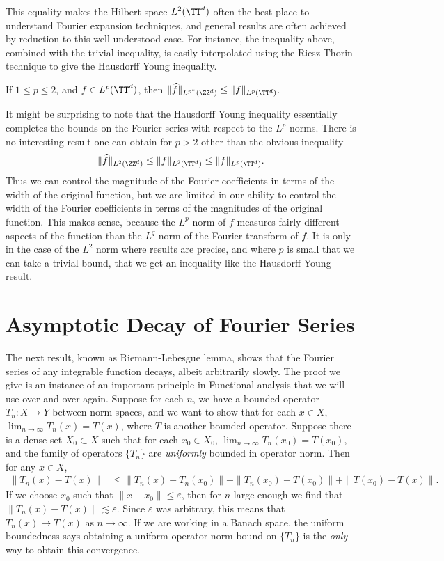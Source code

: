 This equality makes the Hilbert space $L^2(\TT^d)$ often the best place to understand Fourier expansion techniques, and general results are often achieved by reduction to this well understood case. For instance, the inequality above, combined with the trivial inequality, is easily interpolated using the Riesz-Thorin technique to give the Hausdorff Young inequality.

\begin{theorem}
    If $1 \leq p \leq 2$, and $f \in L^p(\TT^d)$, then $\| \widehat{f} \|_{L^{p^*}(\ZZ^d)} \leq \| f \|_{L^p(\TT^d)}$.
\end{theorem}

It might be surprising to note that the Hausdorff Young inequality essentially completes the bounds on the Fourier series with respect to the $L^p$ norms. There is no interesting result one can obtain for $p > 2$ other than the obvious inequality
%
\[ \| \widehat{f} \|_{L^2(\ZZ^d)} \leq \| f \|_{L^2(\TT^d)} \leq \| f \|_{L^p(\TT^d)}. \]
%
Thus we can control the magnitude of the Fourier coefficients in terms of the width of the original function, but we are limited in our ability to control the width of the Fourier coefficients in terms of the magnitudes of the original function. This makes sense, because the $L^p$ norm of $f$ measures fairly different aspects of the function than the $L^q$ norm of the Fourier transform of $f$. It is only in the case of the $L^2$ norm where results are precise, and where $p$ is small that we can take a trivial bound, that we get an inequality like the Hausdorff Young result.

\section{Asymptotic Decay of Fourier Series}

The next result, known as Riemann-Lebesgue lemma, shows that the Fourier series of any integrable function decays, albeit arbitrarily slowly. The proof we give is an instance of an important principle in Functional analysis that we will use over and over again. Suppose for each $n$, we have a bounded operator $T_n: X \to Y$ between norm spaces, and we want to show that for each $x \in X$, $\lim_{n \to \infty} T_n(x) = T(x)$, where $T$ is another bounded operator. Suppose there is a dense set $X_0 \subset X$ such that for each $x_0 \in X_0$, $\lim_{n \to \infty} T_n(x_0) = T(x_0)$, and the family of operators $\{ T_n \}$ are {\it uniformly} bounded in operator norm. Then for any $x \in X$,
%
\begin{align*}
    \| T_n(x) - T(x) \| &\leq \| T_n(x) - T_n(x_0) \| + \| T_n(x_0) - T(x_0) \| + \| T(x_0) - T(x) \|.
\end{align*}
%
If we choose $x_0$ such that $\| x - x_0 \| \leq \varepsilon$, then for $n$ large enough we find that $\| T_n(x) - T(x) \| \lesssim \varepsilon$. Since $\varepsilon$ was arbitrary, this means that $T_n(x) \to T(x)$ as $n \to \infty$. If we are working in a Banach space, the uniform boundedness says obtaining a uniform operator norm bound on $\{ T_n \}$ is the \emph{only} way to obtain this convergence.

